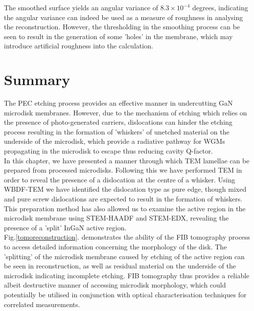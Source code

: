 The smoothed surface yields an angular variance of $8.3 \times 10^{-4}$ degrees, indicating the angular variance can indeed be used as a measure of roughness in analysing the reconstruction. However, the thresholding in the smoothing process can be seen to result in the generation of some 'holes' in the membrane, which may introduce artificial roughness into the calculation.

\section{Summary}
The PEC etching process provides an effective manner in undercutting GaN microdisk membranes. However, due to the mechanism of etching which relies on the presence of photo-generated carriers, dislocations can hinder the etching process resulting in the formation of 'whiskers' of unetched material on the underside of the microdisk, which provide a radiative pathway for WGMs propagating in the microdisk to escape thus reducing cavity Q-factor.\\
In this chapter, we have presented a manner through which TEM lamellae can be prepared from processed microdisks. Following this we have performed TEM in order to reveal the presence of a dislocation at the centre of a whisker. Using WBDF-TEM we have identified the dislocation type as pure edge, though mixed and pure screw dislocations are expected to result in the formation of whiskers. This preparation method has also allowed us to examine the active region in the microdisk membrane using STEM-HAADF and STEM-EDX, revealing the presence of a 'split' InGaN active region.\\
Fig.\ref{tomoreconstruction}. demonstrates the ability of the FIB tomography process to access detailed information concerning the morphology of the disk. The 'splitting' of the microdisk membrane caused by etching of the active region can be seen in reconstruction, as well as residual material on the underside of the microdisk indicating incomplete etching. FIB tomography thus provides a reliable albeit destructive manner of accessing microdisk morphology, which could potentially be utilised in conjunction with optical characterisation techniques for correlated measurements.

